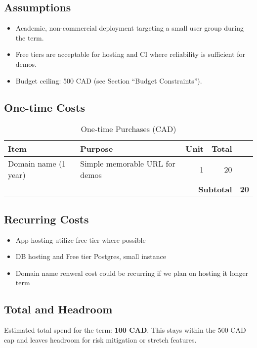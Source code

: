 \documentclass[12pt]{article}
\begin{document}
\subsection{Assumptions}
\begin{itemize}
  \item Academic, non-commercial deployment targeting a small user group during the term.
  \item Free tiers are acceptable for hosting and CI where reliability is sufficient for demos.
  \item Budget ceiling: 500 CAD (see Section ``Budget Constraints'').
\end{itemize}

\subsection{One-time Costs}
\begin{table}[hp]
  \caption{One-time Purchases (CAD)}\label{tab:one_time_costs}
  \begin{tabularx}{\textwidth}{lXrrr}
    \toprule
    \textbf{Item} & \textbf{Purpose} & \textbf{Unit} & \textbf{Total} \\
    \midrule
    Domain name (1 year) & Simple memorable URL for demos & 1 & 20 \\
    \midrule
    \multicolumn{4}{r}{\textbf{Subtotal}} & \textbf{20} \\
    \bottomrule
  \end{tabularx}
\end{table}

\subsection{Recurring Costs}
\begin{itemize}
  \item App hosting utilize free tier where possible
  \item DB hosting and Free tier Postgres, small instance
  \item Domain name renweal cost could be recurring if we plan on hosting it longer term
\end{itemize}

\subsection{Total and Headroom}
\noindent Estimated total spend for the term: \textbf{100 CAD}. This stays within the 500 CAD cap and leaves headroom for risk mitigation or stretch features.
\end{document}
